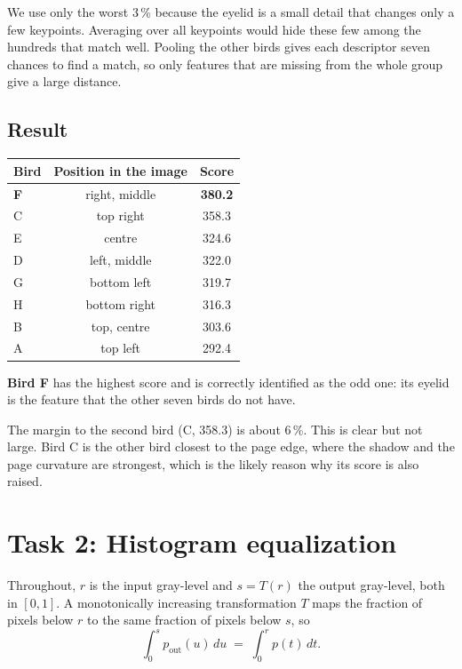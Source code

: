 \documentclass[11pt,a4paper]{article}
\begin{document}
We use only the worst 3\,\% because the eyelid is a small detail that changes only a few keypoints. Averaging over all keypoints would hide these few among the hundreds that match well. Pooling the other birds gives each descriptor seven chances to find a match, so only features that are missing from the whole group give a large distance.

\subsection{Result}

\begin{center}
\begin{tabular}{lcc}
\toprule
Bird & Position in the image & Score \\
\midrule
\textbf{F} & right, middle & \textbf{380.2} \\
C & top right & 358.3 \\
E & centre & 324.6 \\
D & left, middle & 322.0 \\
G & bottom left & 319.7 \\
H & bottom right & 316.3 \\
B & top, centre & 303.6 \\
A & top left & 292.4 \\
\bottomrule
\end{tabular}
\end{center}

\textbf{Bird F} has the highest score and is correctly identified as the odd one: its eyelid is the feature that the other seven birds do not have.

The margin to the second bird (C, 358.3) is about 6\,\%. This is clear but not large. Bird C is the other bird closest to the page edge, where the shadow and the page curvature are strongest, which is the likely reason why its score is also raised.

\section{Task 2: Histogram equalization}

Throughout, $r$ is the input gray-level and $s=T(r)$ the output gray-level, both in $[0,1]$. A monotonically increasing transformation $T$ maps the fraction of pixels below $r$ to the same fraction of pixels below $s$, so
\begin{equation}
    \int_0^{s} p_{\text{out}}(u)\,du \;=\; \int_0^{r} p(t)\,dt .
    \label{eq:cdf}
\end{equation}
\end{document}
